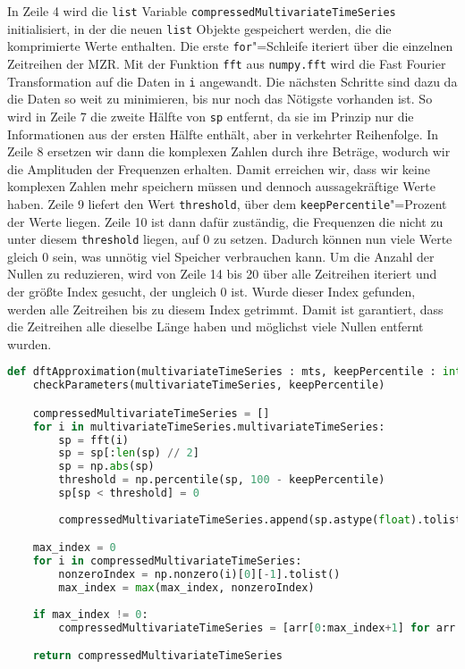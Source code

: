 In Zeile 4 wird die \lstinline|list| Variable \lstinline|compressedMultivariateTimeSeries| initialisiert, in der die neuen \lstinline|list| Objekte gespeichert werden, die die komprimierte Werte enthalten. Die erste \lstinline|for|"=Schleife iteriert über die einzelnen Zeitreihen der \ac{MZR}. Mit der Funktion \lstinline|fft| aus \lstinline|numpy.fft| wird die Fast Fourier Transformation auf die Daten in \lstinline|i| angewandt. Die nächsten Schritte sind dazu da die Daten so weit zu minimieren, bis nur noch das Nötigste vorhanden ist. So wird in Zeile 7 die zweite Hälfte von \lstinline|sp| entfernt, da sie im Prinzip nur die Informationen aus der ersten Hälfte enthält, aber in verkehrter Reihenfolge. In Zeile 8 ersetzen wir dann die komplexen Zahlen durch ihre Beträge, wodurch wir die Amplituden der Frequenzen erhalten. Damit erreichen wir, dass wir keine komplexen Zahlen mehr speichern müssen und dennoch aussagekräftige Werte haben. Zeile 9 liefert den Wert \lstinline|threshold|, über dem \lstinline|keepPercentile|"=Prozent der Werte liegen. Zeile 10 ist dann dafür zuständig, die Frequenzen die nicht zu unter diesem \lstinline|threshold| liegen, auf 0 zu setzen. Dadurch können nun viele Werte gleich 0 sein, was unnötig viel Speicher verbrauchen kann. Um die Anzahl der Nullen zu reduzieren, wird von Zeile 14 bis 20 über alle Zeitreihen iteriert und der größte Index gesucht, der ungleich 0 ist. Wurde dieser Index gefunden, werden alle Zeitreihen bis zu diesem Index getrimmt. Damit ist garantiert, dass die Zeitreihen alle dieselbe Länge haben und möglichst viele Nullen entfernt wurden.
\begin{lstlisting}[caption={Diskrete"=Fourier"=Transformation}, label=lst:diskretefouriertransformation, style=Python, language=Python]
def dftApproximation(multivariateTimeSeries : mts, keepPercentile : int):
    checkParameters(multivariateTimeSeries, keepPercentile)

    compressedMultivariateTimeSeries = []
    for i in multivariateTimeSeries.multivariateTimeSeries:
        sp = fft(i)
        sp = sp[:len(sp) // 2]
        sp = np.abs(sp)
        threshold = np.percentile(sp, 100 - keepPercentile)
        sp[sp < threshold] = 0
        
        compressedMultivariateTimeSeries.append(sp.astype(float).tolist())

    max_index = 0
    for i in compressedMultivariateTimeSeries:
        nonzeroIndex = np.nonzero(i)[0][-1].tolist()
        max_index = max(max_index, nonzeroIndex)
        
    if max_index != 0:
        compressedMultivariateTimeSeries = [arr[0:max_index+1] for arr in compressedMultivariateTimeSeries]

    return compressedMultivariateTimeSeries
\end{lstlisting}